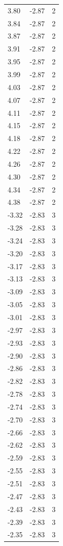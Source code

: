 \begin{longtable}{lrr}
  3.80 & -2.87 & 2 \\
  3.84 & -2.87 & 2 \\
  3.87 & -2.87 & 2 \\
  3.91 & -2.87 & 2 \\
  3.95 & -2.87 & 2 \\
  3.99 & -2.87 & 2 \\
  4.03 & -2.87 & 2 \\
  4.07 & -2.87 & 2 \\
  4.11 & -2.87 & 2 \\
  4.15 & -2.87 & 2 \\
  4.18 & -2.87 & 2 \\
  4.22 & -2.87 & 2 \\
  4.26 & -2.87 & 2 \\
  4.30 & -2.87 & 2 \\
  4.34 & -2.87 & 2 \\
  4.38 & -2.87 & 2 \\
  -3.32 & -2.83 & 3 \\
  -3.28 & -2.83 & 3 \\
  -3.24 & -2.83 & 3 \\
  -3.20 & -2.83 & 3 \\
  -3.17 & -2.83 & 3 \\
  -3.13 & -2.83 & 3 \\
  -3.09 & -2.83 & 3 \\
  -3.05 & -2.83 & 3 \\
  -3.01 & -2.83 & 3 \\
  -2.97 & -2.83 & 3 \\
  -2.93 & -2.83 & 3 \\
  -2.90 & -2.83 & 3 \\
  -2.86 & -2.83 & 3 \\
  -2.82 & -2.83 & 3 \\
  -2.78 & -2.83 & 3 \\
  -2.74 & -2.83 & 3 \\
  -2.70 & -2.83 & 3 \\
  -2.66 & -2.83 & 3 \\
  -2.62 & -2.83 & 3 \\
  -2.59 & -2.83 & 3 \\
  -2.55 & -2.83 & 3 \\
  -2.51 & -2.83 & 3 \\
  -2.47 & -2.83 & 3 \\
  -2.43 & -2.83 & 3 \\
  -2.39 & -2.83 & 3 \\
  -2.35 & -2.83 & 3 \\

\end{longtable}

